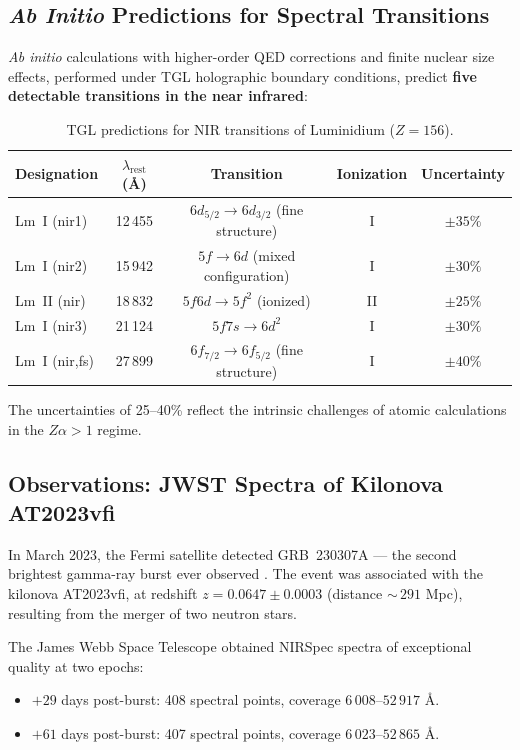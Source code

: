 \documentclass[12pt,a4paper,twoside]{article}
\begin{document}
\subsection{\textit{Ab Initio} Predictions for Spectral Transitions}

\textit{Ab initio} calculations with higher-order QED corrections and finite nuclear size effects, performed under TGL holographic boundary conditions, predict \textbf{five detectable transitions in the near infrared}:

\begin{table}[H]
\centering
\caption{TGL predictions for NIR transitions of Luminidium ($Z = 156$).}
\label{tab:lm_predictions}
\begin{tabular}{lcccc}
\toprule
\textbf{Designation} & $\lambda_{\text{rest}}$ (\AA) & \textbf{Transition} & \textbf{Ionization} & \textbf{Uncertainty} \\
\midrule
Lm~I (nir1) & 12\,455 & $6d_{5/2} \to 6d_{3/2}$ (fine structure) & I & $\pm 35\%$ \\
Lm~I (nir2) & 15\,942 & $5f \to 6d$ (mixed configuration) & I & $\pm 30\%$ \\
Lm~II (nir) & 18\,832 & $5f6d \to 5f^2$ (ionized) & II & $\pm 25\%$ \\
Lm~I (nir3) & 21\,124 & $5f7s \to 6d^2$ & I & $\pm 30\%$ \\
Lm~I (nir,fs) & 27\,899 & $6f_{7/2} \to 6f_{5/2}$ (fine structure) & I & $\pm 40\%$ \\
\bottomrule
\end{tabular}
\end{table}

\noindent The uncertainties of 25--40\% reflect the intrinsic challenges of atomic calculations in the $Z\alpha > 1$ regime.



\subsection{Observations: JWST Spectra of Kilonova AT2023vfi}

In March 2023, the Fermi satellite detected GRB~230307A --- the second brightest gamma-ray burst ever observed \cite{Levan2024}. The event was associated with the kilonova AT2023vfi, at redshift $z = 0.0647 \pm 0.0003$ (distance ${\sim}\,291$ Mpc), resulting from the merger of two neutron stars.

The James Webb Space Telescope obtained NIRSpec spectra of exceptional quality at two epochs:
\begin{itemize}[nosep]
\item $+29$ days post-burst: 408 spectral points, coverage $6\,008$--$52\,917$ \AA.
\item $+61$ days post-burst: 407 spectral points, coverage $6\,023$--$52\,865$ \AA.
\end{itemize}
\end{document}
